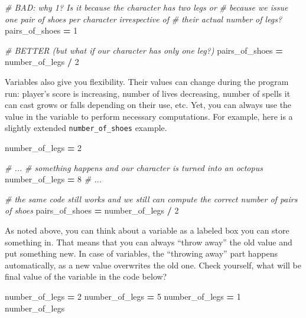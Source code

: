 \documentclass[
]{book}
\newenvironment{Shaded}{\begin{snugshade}}{\end{snugshade}}
\newcommand{\CommentTok}[1]{\textcolor[rgb]{0.56,0.35,0.01}{\textit{#1}}}
\newcommand{\DecValTok}[1]{\textcolor[rgb]{0.00,0.00,0.81}{#1}}
\newcommand{\NormalTok}[1]{#1}
\newcommand{\OperatorTok}[1]{\textcolor[rgb]{0.81,0.36,0.00}{\textbf{#1}}}
\begin{document}
\begin{Shaded}
\begin{Highlighting}[]
\CommentTok{\# BAD: why 1? Is it because the character has two legs or}
\CommentTok{\# because we issue one pair of shoes per character irrespective of}
\CommentTok{\# their actual number of legs?}
\NormalTok{pairs\_of\_shoes }\OperatorTok{=} \DecValTok{1}

\CommentTok{\# BETTER (but what if our character has only one leg?)}
\NormalTok{pairs\_of\_shoes }\OperatorTok{=}\NormalTok{ number\_of\_legs }\OperatorTok{/} \DecValTok{2}
\end{Highlighting}
\end{Shaded}

Variables also give you flexibility. Their values can change during the program run: player's score is increasing, number of lives decreasing, number of spells it can cast grows or falls depending on their use, etc. Yet, you can always use the value in the variable to perform necessary computations. For example, here is a slightly extended \texttt{number\_of\_shoes} example.

\begin{Shaded}
\begin{Highlighting}[]
\NormalTok{number\_of\_legs }\OperatorTok{=} \DecValTok{2}

\CommentTok{\# ...}
\CommentTok{\# something happens and our character is turned into an octopus}
\NormalTok{number\_of\_legs }\OperatorTok{=} \DecValTok{8}
\CommentTok{\# ...}

\CommentTok{\# the same code still works and we still can compute the correct number of pairs of shoes}
\NormalTok{pairs\_of\_shoes }\OperatorTok{=}\NormalTok{ number\_of\_legs }\OperatorTok{/} \DecValTok{2}
\end{Highlighting}
\end{Shaded}

As noted above, you can think about a variable as a labeled box you can store something in. That means that you can always ``throw away'' the old value and put something new. In case of variables, the ``throwing away'' part happens automatically, as a new value overwrites the old one. Check yourself, what will be final value of the variable in the code below?

\begin{Shaded}
\begin{Highlighting}[]
\NormalTok{number\_of\_legs }\OperatorTok{=} \DecValTok{2}
\NormalTok{number\_of\_legs }\OperatorTok{=} \DecValTok{5}
\NormalTok{number\_of\_legs }\OperatorTok{=} \DecValTok{1}
\NormalTok{number\_of\_legs}
\end{Highlighting}
\end{Shaded}
\end{document}
